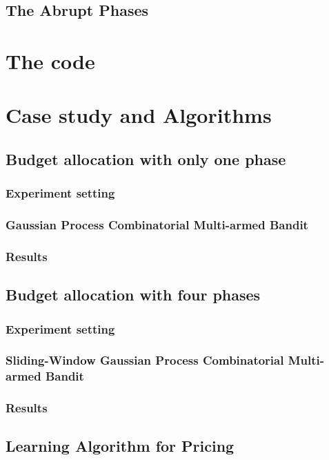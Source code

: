 \documentclass[12pt]{article}
\begin{document}
	\subsection{The Abrupt Phases}
	
	\section{The code}
		
	\section{Case study and Algorithms}
	
	\subsection{Budget allocation with only one phase}
	
	\subsubsection{Experiment setting}
	
	\subsubsection{Gaussian Process Combinatorial Multi-armed Bandit}
	
	\newpage
	\subsubsection{Results}
	
	\newpage
	\subsection{Budget allocation with four phases}
	
	\subsubsection{Experiment setting}
	
	\subsubsection{Sliding-Window Gaussian Process Combinatorial Multi-armed Bandit}
	
	\subsubsection{Results}
	
	\newpage
	\subsection{Learning Algorithm for Pricing}
	
	\newpage
\end{document}

